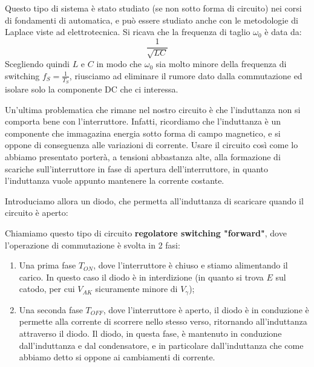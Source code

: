 \documentclass[a4paper,11pt]{article}
\begin{document}
Questo tipo di sistema è stato studiato (se non sotto forma di circuito) nei corsi di fondamenti di automatica, e può essere studiato anche con le metodologie di Laplace viste ad elettrotecnica. Si ricava che la frequenza di taglio $\omega_0$ è data da:
$$
\frac{1}{\sqrt{LC}}
$$
Scegliendo quindi $L$ e $C$ in modo che $\omega_0$ sia molto minore della frequenza di switching $f_S = \frac{1}{T_S}$, riusciamo ad eliminare il rumore dato dalla commutazione ed isolare solo la componente DC che ci interessa.

Un'ultima problematica che rimane nel nostro circuito è che l'induttanza non si comporta bene con l'interruttore. Infatti, ricordiamo che l'induttanza è un componente che immagazina energia sotto forma di campo magnetico, e si oppone di conseguenza alle variazioni di corrente. Usare il circuito così come lo abbiamo presentato porterà, a tensioni abbastanza alte, alla formazione di scariche sull'interruttore in fase di apertura dell'interruttore, in quanto l'induttanza vuole appunto mantenere la corrente costante.

Introduciamo allora un diodo, che permetta all'induttanza di scaricare quando il circuito è aperto:
\begin{center}
\end{center}

Chiamiamo questo tipo di circuito \textbf{regolatore switching "forward"}, dove l'operazione di commutazione è svolta in 2 fasi:
\begin{enumerate}
	\item Una prima fase $T_{ON}$, dove l'interruttore è chiuso e stiamo alimentando il carico. In questo caso il diodo è in interdizione (in quanto si trova $E$ sul catodo, per cui $V_{AK}$ sicuramente minore di $V_\gamma$);
	\item Una seconda fase $T_{OFF}$, dove l'interruttore è aperto, il diodo è in conduzione è permette alla corrente di scorrere nello stesso verso, ritornando all'induttanza attraverso il diodo. Il diodo, in questa fase, è mantenuto in conduzione dall'induttanza e dal condensatore, e in particolare dall'induttanza che come abbiamo detto si oppone ai cambiamenti di corrente. 
\end{enumerate}
\end{document}
